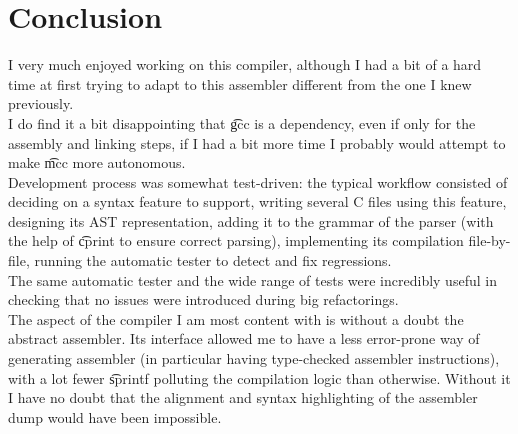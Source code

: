 \section{Conclusion}
I very much enjoyed working on this compiler, although I had a bit of a hard time at first trying to adapt to this assembler different from the one I knew previously.\\
I do find it a bit disappointing that \t{gcc} is a dependency, even if only for the assembly and linking steps, if I had a bit more time I probably would attempt to make \t{mcc} more autonomous.\\

Development process was somewhat test-driven: the typical workflow consisted of deciding on a syntax feature to support, writing several C files using this feature, designing its AST representation, adding it to the grammar of the parser (with the help of \t{cprint} to ensure correct parsing), implementing its compilation file-by-file, running the automatic tester to detect and fix regressions.\\
The same automatic tester and the wide range of tests were incredibly useful in checking that no issues were introduced during big refactorings.\\

The aspect of the compiler I am most content with is without a doubt the abstract assembler. Its interface allowed me to have a less error-prone way of generating assembler (in particular having type-checked assembler instructions), with a lot fewer \t{sprintf} polluting the compilation logic than otherwise. Without it I have no doubt that the alignment and syntax highlighting of the assembler dump would have been impossible.
